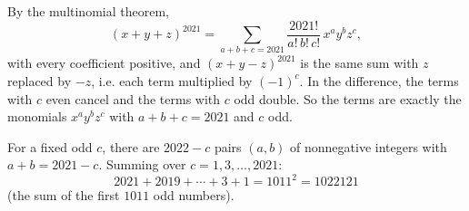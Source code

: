 By the multinomial theorem,
\[(x+y+z)^{2021}=\sum_{a+b+c=2021}\dfrac{2021!}{a!\,b!\,c!}\,x^ay^bz^c,\]
with every coefficient positive, and $(x+y-z)^{2021}$ is the same sum with $z$ replaced by $-z$, i.e. each term multiplied by $(-1)^c$. In the difference, the terms with $c$ even cancel and the terms with $c$ odd double. So the terms are exactly the monomials $x^ay^bz^c$ with $a+b+c=2021$ and $c$ odd.

For a fixed odd $c$, there are $2022-c$ pairs $(a,b)$ of nonnegative integers with $a+b=2021-c$. Summing over $c=1,3,\dots,2021$:
\[2021+2019+\cdots+3+1=1011^2=\boxed{1022121}\]
(the sum of the first $1011$ odd numbers).
